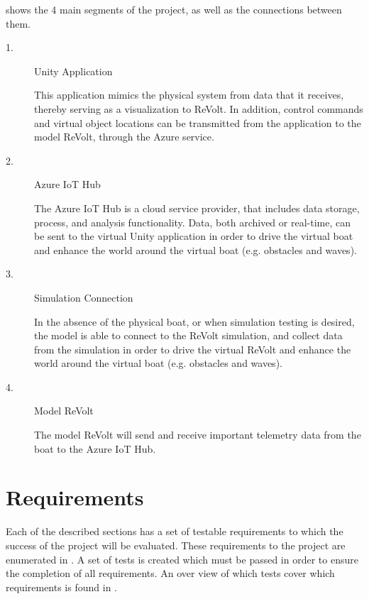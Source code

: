  shows the 4 main segments of the project, as well as the connections between them. 
\begin{description}
 \item[1.] Unity Application
 
 This application mimics the physical system from data that it receives, thereby serving as a visualization to ReVolt. In addition, control commands and virtual object locations can be transmitted from the application to the model ReVolt, through the Azure service.
 \item[2.] Azure IoT Hub
 
 The Azure IoT Hub is a cloud service provider, that includes data storage, process, and analysis functionality. Data, both archived or real-time, can be sent to the virtual Unity application in order to drive the virtual boat and enhance the world around the virtual boat (e.g. obstacles and waves).
 \item[3.] Simulation Connection
 
 In the absence of the physical boat, or when simulation testing is desired, the model is able to connect to the ReVolt simulation, and collect data from the simulation in order to drive the virtual ReVolt and enhance the world around the virtual boat (e.g. obstacles and waves).
 \item[4.] Model ReVolt
 
 The model ReVolt will send and receive important telemetry data from the boat to the Azure IoT Hub.
\end{description}







\section{Requirements}
Each of the described sections has a set of testable requirements to which the success of the project will be evaluated. These requirements to the project are enumerated in . A set of tests is created which must be passed in order to ensure the completion of all requirements. An over view of which tests cover which requirements is found in .

